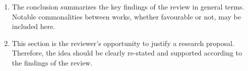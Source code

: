 \documentclass[a4paper,11pt]{article}
\begin{document}
\begin{enumerate}
    \item The conclusion summarizes the key findings of the review in general terms. Notable commonalities between works, whether favourable or not, may be included here.
    \item This section is the reviewer’s opportunity to justify a research proposal. Therefore, the idea should be clearly re-stated and supported according to the findings of the review.
\end{enumerate}




\small
\end{document}
